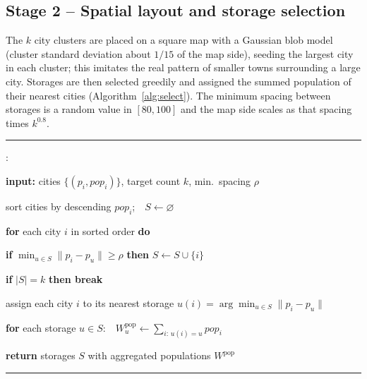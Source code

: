 \documentclass[runningheads]{llncs}
\newcounter{algln}
\newenvironment{pcode}{%
  \setcounter{algln}{0}%
  \par\vspace{2pt}\hrule\vspace{3pt}%
  \begin{list}{\footnotesize\ttfamily\stepcounter{algln}\thealgln:}%
    {\setlength{\leftmargin}{2.2em}\setlength{\itemsep}{0pt}%
     \setlength{\parsep}{0pt}\setlength{\topsep}{0pt}}%
}{%
  \end{list}\vspace{2pt}\hrule\vspace{2pt}%
}
\newcommand{\KW}[1]{\textbf{#1}}
\newcommand{\IND}{\hspace*{1.3em}}
\begin{document}
\subsection{Stage 2 -- Spatial layout and storage selection}
The $k$ city clusters are placed on a square map with a Gaussian blob model
(cluster standard deviation about $1/15$ of the map side), seeding the largest
city in each cluster; this imitates the real pattern of smaller towns
surrounding a large city. Storages are then selected greedily and assigned the
summed population of their nearest cities (Algorithm~\ref{alg:select}). The
minimum spacing between storages is a random value in $[80,100]$ and the map side
scales as that spacing times $k^{0.8}$.

\begin{algorithm}[t]
\caption{Greedy storage selection and population assignment.}
\label{alg:select}
\begin{pcode}
\item \KW{input:} cities $\{(p_i,pop_i)\}$, target count $k$, min.\ spacing $\rho$
\item sort cities by descending $pop_i$;\ \ $S\gets\varnothing$
\item \KW{for} each city $i$ in sorted order \KW{do}
\item \IND \KW{if} $\min_{u\in S}\lVert p_i-p_u\rVert \ge \rho$ \KW{then} $S\gets S\cup\{i\}$
\item \IND \KW{if} $|S|=k$ \KW{then break}
\item assign each city $i$ to its nearest storage $u(i)=\arg\min_{u\in S}\lVert p_i-p_u\rVert$
\item \KW{for} each storage $u\in S$:\ \ $W^{\text{pop}}_u\gets\textstyle\sum_{i:\,u(i)=u} pop_i$
\item \KW{return} storages $S$ with aggregated populations $W^{\text{pop}}$
\end{pcode}
\end{algorithm}
\end{document}
